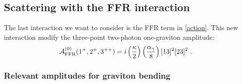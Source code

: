 \documentclass[a4paper,11pt]{article}
\numberwithin{equation}{section}
\newcommand{\sqr}[2]{\lbrack #1 #2 \rbrack}
\newcommand{\cA}{\mathcal{A}}
\def\cA{\mathcal{A}}
\begin{document}
\subsection{Scattering with the FFR interaction}

The last interaction we want to consider is the FFR term  in \eqref{action}. 
This new interaction modify the three-point two-photon one-graviton amplitude:
\begin{equation}
    \cA^{(0)}_{\rm FFR} (1^+ , 2^+ , 3^{++}) = i \left(\frac{\kappa}{2}\right)\left(\frac{\alpha_\gamma}{8}\right) \sqr{1}{3}^2 \sqr{2}{3}^2\ .
\end{equation}

\subsubsection{Relevant amplitudes for graviton bending}
\end{document}
